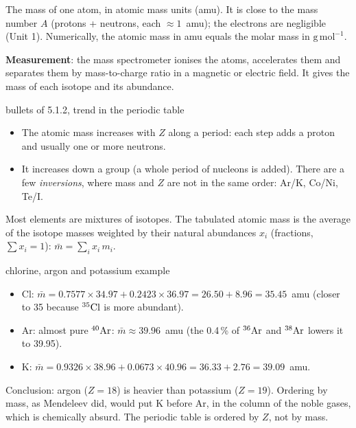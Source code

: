 \begin{concept}
The mass of one atom, in atomic mass units (amu). It is close to the mass number $A$ (protons +
neutrons, each $\approx1$~amu); the electrons are negligible (Unit 1). Numerically, the atomic mass in amu
equals the molar mass in $\mathrm{g\,mol^{-1}}$.
\end{concept}
\textbf{Measurement}: the mass spectrometer ionises the atoms, accelerates them and separates them by
mass-to-charge ratio in a magnetic or electric field. It gives the mass of each isotope and its
abundance.
\begin{handout}{bullets of 5.1.2, trend in the periodic table}
\begin{itemize}
  \item The atomic mass increases with $Z$ along a period: each step adds a proton and usually one or
        more neutrons.
  \item It increases down a group (a whole period of nucleons is added). There are a few
        \emph{inversions}, where mass and $Z$ are not in the same order: Ar/K, Co/Ni, Te/I.
\end{itemize}
\end{handout}
\begin{concept}
Most elements are mixtures of isotopes. The tabulated atomic mass is the average of the isotope
masses weighted by their natural abundances $x_i$ (fractions, $\sum x_i = 1$):
$\boxed{\bar m = \sum_i x_i\,m_i}$.
\end{concept}
\begin{handout}{chlorine, argon and potassium example}
\begin{itemize}
\item Cl: $\bar m = 0.7577\times34.97 + 0.2423\times36.97 = 26.50 + 8.96 = \mathbf{35.45}$~amu
(closer to 35 because ${}^{35}\mathrm{Cl}$ is more abundant).
\item Ar: almost pure ${}^{40}\mathrm{Ar}$: $\bar m \approx 39.96$~amu (the 0.4\,\% of ${}^{36}\mathrm{Ar}$ and ${}^{38}\mathrm{Ar}$
lowers it to 39.95).
\item K: $\bar m = 0.9326\times38.96 + 0.0673\times40.96 = 36.33 + 2.76 = \mathbf{39.09}$~amu.
\end{itemize}
Conclusion: argon ($Z = 18$) is heavier than potassium ($Z = 19$). Ordering by mass, as Mendeleev did,
would put K before Ar, in the column of the noble gases, which is chemically absurd. The periodic table is
ordered by $Z$, not by mass.
\end{handout}


